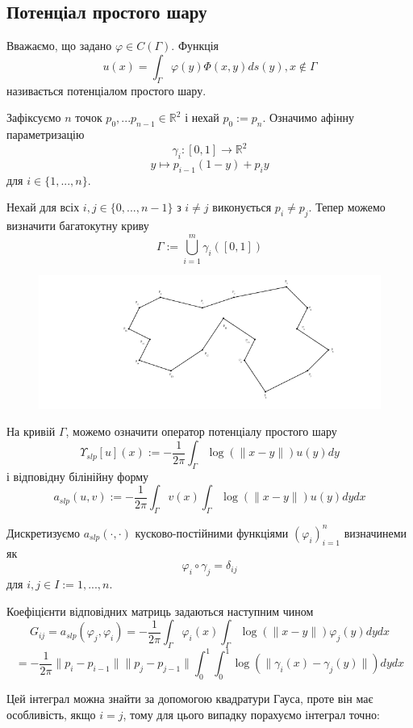 \documentclass[12pt]{report}
\begin{document}
	\subsection{Потенціал простого шару}
	\begin{Def}
		Вважаємо, що задано $\varphi\in C(\Gamma)$. Функція $$u(x)=\int_{\Gamma}\varphi(y)\Phi(x,y)ds(y),  x\not\in\Gamma$$
		називається потенціалом простого шару.
	\end{Def}
	\par Зафіксуємо $n$ точок $p_0,...p_{n-1}\in \mathbb{R}^2$ і нехай $p_0:=p_n$. Означимо афінну параметризацію $$\gamma_i:[0,1]\rightarrow\mathbb{R}^2$$
	$$y\mapsto p_{i-1}(1-y)+p_iy$$
	для $i\in\{1,...,n\}$.
	\par Нехай для всіх $i,j\in\{0,...,n-1\}$ з $i\not=j$ виконується $p_i\not=p_j$. Тепер можемо визначити багатокутну криву
	$$\Gamma:=\bigcup_{i=1}^m\gamma_i([0,1])$$
	\begin{figure}[h]{
			\includegraphics{2_2}
		}
	\end{figure}
	\par На кривій $\Gamma$, можемо означити оператор потенціалу простого шару
	$$\Upsilon_{slp}[u](x):=-\frac{1}{2\pi}\int_{\Gamma}\log(\|x-y\|)u(y)dy$$
	і відповідну білінійну форму
	$$a_{slp}(u,v):=-\frac{1}{2\pi}\int_{\Gamma}v(x)\int_{\Gamma}\log(\|x-y\|)u(y)dydx$$
	\par Дискретизуємо $a_{slp}(\cdot,\cdot)$ кусково-постійними функціями $(\varphi_i)_{i=1}^n$ визначинеми як $$\varphi_i\circ\gamma_j=\delta_{ij}$$
	для $i,j\in I:={1,...,n}$.
	\par Коефіцієнти відповідних матриць задаються наступним чином $$G_{ij}=a_{slp}(\varphi_j,\varphi_i)=-\frac{1}{2\pi}\int_{\Gamma}\varphi_i(x)\int_{\Gamma}\log(\|x-y\|)\varphi_j(y)dydx$$
	$$=-\frac{1}{2\pi}\|p_i-p_{i-1}\| \|p_j-p_{j-1}\|\int_{0}^{1}\int_{0}^{1}\log(\|\gamma_i(x)-\gamma_j(y)\|)dydx$$
	\par Цей інтеграл можна знайти за допомогою квадратури Гауса, проте він має особливість, якщо $i=j$, тому для цього випадку порахуємо інтеграл точно:
\end{document}
